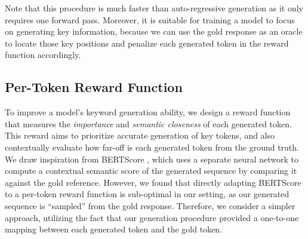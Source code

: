 Note that this procedure is much faster than auto-regressive generation as it only requires one forward pass. Moreover, it is suitable for training a model to focus on generating key information, because we can use the gold response as an oracle to locate those key positions and penalize each generated token in the reward function accordingly. 

\subsection{Per-Token Reward Function}
\label{sec:Per-Token Reward Function}

To improve a model's keyword generation ability, we design a reward function that measures the \emph{importance} and \emph{semantic closeness} of each generated token.
This reward aims to prioritize accurate generation of key tokens, and also contextually evaluate how far-off is each generated token from the ground truth.
We draw inspiration from BERTScore \cite{BERTScore}, which uses a separate neural network to compute a contextual semantic score of the generated sequence by comparing it against the gold reference. 
However, we found that directly adapting BERTScore to a per-token reward function is sub-optimal in our setting, as our generated sequence is ``sampled'' from the gold response. Therefore, we consider a simpler approach, utilizing the fact that our generation procedure provided a one-to-one mapping between each generated token and the gold token. 


